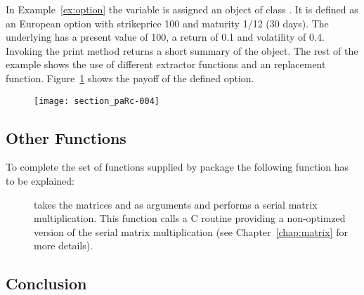 In Example~\ref{ex:option} the variable  is assigned an
object of class . It is defined as an European option
with strikeprice 100 and maturity 1/12 (30 days). The underlying has a
present value of 100, a return of 0.1 and volatility of 0.4. Invoking the print
method returns a short summary of the object. The rest
of the example shows the use of different extractor functions and an
replacement function. Figure~\ref{fig:payoff} shows the payoff of the
defined option.

\begin{figure}
\centering
\texttt{[image: section\_paRc-004]}
\label{fig:payoff} 
\end{figure}

\subsection{Other Functions}

To complete the set of functions supplied by package  the
following function has to be explained:

\begin{description}
\item[] takes the matrices  and
   as arguments and performs a serial matrix
  multiplication. This function calls a C routine providing a
  non-optimzed version of the serial matrix multiplication (see
  Chapter~\ref{chap:matrix} for more details).  
\end{description}

\subsection{Conclusion}

